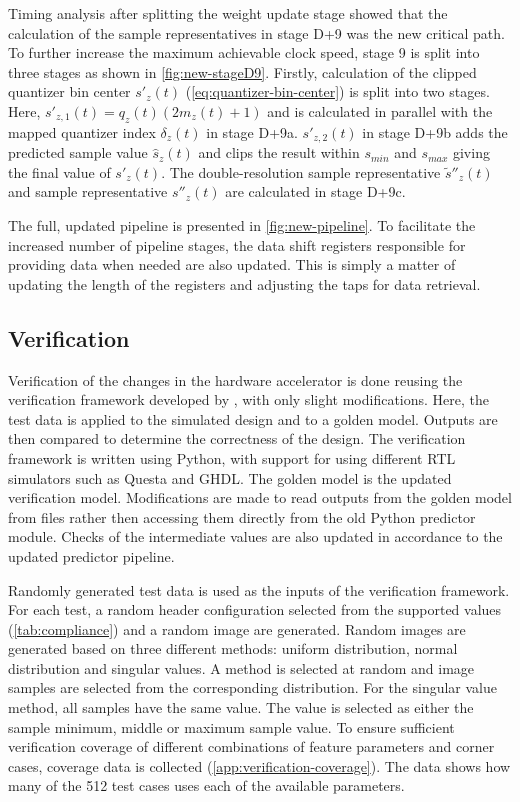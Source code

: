 Timing analysis after splitting the weight update stage showed that the calculation of the sample representatives in stage D+9 was the new critical path. To further increase the maximum achievable clock speed, stage 9 is split into three stages as shown in \autoref{fig:new-stageD9}. Firstly, calculation of the clipped quantizer bin center $s'_z(t)$ (\autoref{eq:quantizer-bin-center}) is split into two stages. Here, $s'_{z,1}(t) = q_z(t)(2 m_z(t) + 1)$ and is calculated in parallel with the mapped quantizer index $\delta_z(t)$ in stage D+9a. $s'_{z,2}(t)$ in stage D+9b adds the predicted sample value $\hat{s}_z(t)$ and clips the result within $s_{min}$ and $s_{max}$ giving the final value of $s'_z(t)$. The double-resolution sample representative $\tilde{s}''_z(t)$ and sample representative $s''_z(t)$ are calculated in stage D+9c.

The full, updated pipeline is presented in \autoref{fig:new-pipeline}. To facilitate the increased number of pipeline stages, the data shift registers responsible for providing data when needed are also updated. This is simply a matter of updating the length of the registers and adjusting the taps for data retrieval.

\subsection{Verification}

Verification of the changes in the hardware accelerator is done reusing the verification framework developed by \citeauthor{vorhaugHyperspectralImageCompression2024}, with only slight modifications. Here, the test data is applied to the simulated design and to a golden model. Outputs are then compared to determine the correctness of the design. The verification framework is written using Python, with support for using different \acrshort{RTL} simulators such as Questa and GHDL. The golden model is the updated verification model. Modifications are made to read outputs from the golden model from files rather then accessing them directly from the old Python predictor module. Checks of the intermediate values are also updated in accordance to the updated predictor pipeline.

Randomly generated test data is used as the inputs of the verification framework. For each test, a random header configuration selected from the supported values (\autoref{tab:compliance}) and a random image are generated. Random images are generated based on three different methods: uniform distribution, normal distribution and singular values. A method is selected at random and image samples are selected from the corresponding distribution. For the singular value method, all samples have the same value. The value is selected as either the sample minimum, middle or maximum sample value. To ensure sufficient verification coverage of different combinations of feature parameters and corner cases, coverage data is collected (\autoref{app:verification-coverage}). The data shows how many of the 512 test cases uses each of the available parameters.

